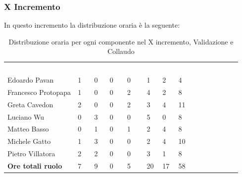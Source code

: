 \subsubsection{X Incremento}
In questo incremento la distribuzione oraria è la seguente:
\begin{table}[H]
\begin{center}
\renewcommand{\arraystretch}{1.25}
\begin{tabular}{ m{}<{\centering}  m{}<{\centering} m{}<{\centering} m{}<{\centering}  m{}<{\centering}  m{}<{\centering}  m{}<{\centering}  m{}<{\centering}   }
	\rowcolor{darkblue}
	\textcolor{white}{\textbf{Componente}} &\textcolor{white}{\textbf{Re}}&\textcolor{white}{\textbf{Pt}}&\textcolor{white}{\textbf{An}}&\textcolor{white}{\textbf{Am}}&\textcolor{white}{\textbf{Pr}}&\textcolor{white}{\textbf{Ve}}&\textcolor{white}{\textbf{Ore complessive}}\\ 
	Edoardo Pavan & 1 & 0 & 0 & 0 & 1 & 2 & 4 \\	
	
	Francesco Protopapa & 1 & 0 & 0 & 2 & 4 & 2 & 8 \\

	Greta Cavedon & 2 & 0 & 0 & 2 & 3 & 4 & 11 \\
	
	Luciano Wu & 0 & 3 & 0 & 0 & 5 & 0 & 8 \\
	
	Matteo Basso & 0 & 1 & 0 & 1 & 2 & 4 & 8 \\
	
	Michele Gatto & 1 & 3 & 0 & 0 & 2 & 4 & 10 \\
	
	Pietro Villatora & 2 & 2 & 0 & 0 & 3 & 1 & 8 \\
	
	\textbf{Ore totali ruolo} & 7 & 9 & 0 & 5 & 20 & 17 & 58 \\

\end{tabular}
\caption{Distribuzione oraria per ogni componente nel X incremento, Validazione e Collaudo}
\end{center}
\end{table}

